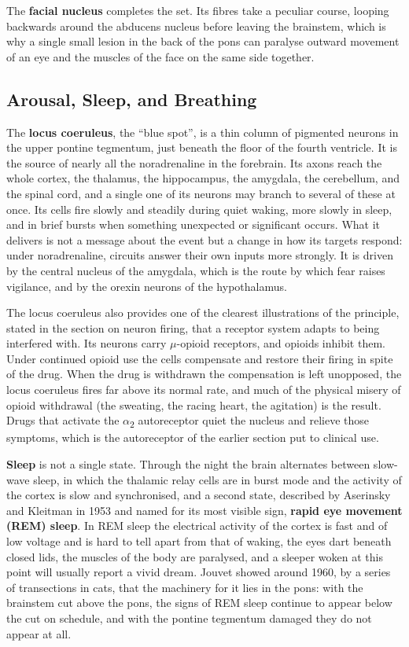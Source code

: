 \documentclass[11pt]{article}
\begin{document}
The \textbf{facial nucleus} completes the set. Its fibres take a peculiar course, looping backwards around the abducens nucleus before leaving the brainstem, which is why a single small lesion in the back of the pons can paralyse outward movement of an eye and the muscles of the face on the same side together.

\subsection{Arousal, Sleep, and Breathing}

The \textbf{locus coeruleus}, the ``blue spot'', is a thin column of pigmented neurons in the upper pontine tegmentum, just beneath the floor of the fourth ventricle. It is the source of nearly all the noradrenaline in the forebrain. Its axons reach the whole cortex, the thalamus, the hippocampus, the amygdala, the cerebellum, and the spinal cord, and a single one of its neurons may branch to several of these at once. Its cells fire slowly and steadily during quiet waking, more slowly in sleep, and in brief bursts when something unexpected or significant occurs. What it delivers is not a message about the event but a change in how its targets respond: under noradrenaline, circuits answer their own inputs more strongly. It is driven by the central nucleus of the amygdala, which is the route by which fear raises vigilance, and by the orexin neurons of the hypothalamus.

The locus coeruleus also provides one of the clearest illustrations of the principle, stated in the section on neuron firing, that a receptor system adapts to being interfered with. Its neurons carry $\mu$-opioid receptors, and opioids inhibit them. Under continued opioid use the cells compensate and restore their firing in spite of the drug. When the drug is withdrawn the compensation is left unopposed, the locus coeruleus fires far above its normal rate, and much of the physical misery of opioid withdrawal (the sweating, the racing heart, the agitation) is the result. Drugs that activate the $\alpha$\textsubscript{2} autoreceptor quiet the nucleus and relieve those symptoms, which is the autoreceptor of the earlier section put to clinical use.

\textbf{Sleep} is not a single state. Through the night the brain alternates between slow-wave sleep, in which the thalamic relay cells are in burst mode and the activity of the cortex is slow and synchronised, and a second state, described by Aserinsky and Kleitman in 1953 and named for its most visible sign, \textbf{rapid eye movement (REM) sleep}. In REM sleep the electrical activity of the cortex is fast and of low voltage and is hard to tell apart from that of waking, the eyes dart beneath closed lids, the muscles of the body are paralysed, and a sleeper woken at this point will usually report a vivid dream. Jouvet showed around 1960, by a series of transections in cats, that the machinery for it lies in the pons: with the brainstem cut above the pons, the signs of REM sleep continue to appear below the cut on schedule, and with the pontine tegmentum damaged they do not appear at all.
\end{document}

